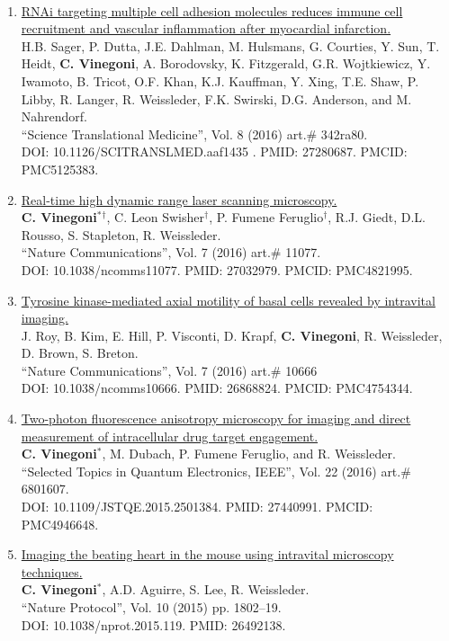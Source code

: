 \documentclass{resume}
\begin{document}
\begin{category}{~~}
\begin{enumerate}
\item
\href{https://tinyurl.com/y4hpumay}{RNAi targeting multiple cell adhesion molecules reduces immune cell recruitment and vascular inflammation after myocardial infarction.}\\
H.B. Sager, P. Dutta, J.E. Dahlman, M. Hulsmans, G. Courties, Y. Sun, T. Heidt, {\bf C. Vinegoni}, A. Borodovsky, K. Fitzgerald, G.R. Wojtkiewicz, Y. Iwamoto, B. Tricot, O.F. Khan, K.J. Kauffman, Y. Xing, T.E. Shaw, P. Libby, R. Langer, R. Weissleder, F.K. Swirski, D.G. Anderson, and M. Nahrendorf.\\
 ``Science Translational Medicine'', Vol. 8 (2016) art.$\#$ 342ra80. \\DOI:
10.1126/SCITRANSLMED.aaf1435 . PMID: 27280687. PMCID: PMC5125383.

\item
\href{https://tinyurl.com/jrvjrusj}{Real-time high dynamic range laser scanning microscopy.}\\
{\bf C. Vinegoni$^*${$^\dag$}}, C. Leon Swisher$^\dag$, P. Fumene Feruglio$^\dag$, R.J. Giedt, D.L. Rousso, S. Stapleton, R. Weissleder.\\
 ``Nature Communications'', Vol. 7 (2016) art.$\#$ 11077. \\DOI:
10.1038/ncomms11077. PMID: 27032979. PMCID: PMC4821995.

\item
\href{https://tinyurl.com/yx8ye7m3}{Tyrosine kinase-mediated axial motility of basal cells revealed by intravital imaging.}\\
J. Roy, B. Kim, E. Hill, P. Visconti, D. Krapf, {\bf C. Vinegoni}, R. Weissleder, D. Brown, S. Breton.\\
 ``Nature Communications'', Vol. 7 (2016) art.$\#$ 10666 \\DOI:
10.1038/ncomms10666. PMID: 26868824. PMCID: PMC4754344.

\item
\href{https://tinyurl.com/y7uz4zbp}{Two-photon fluorescence anisotropy microscopy for imaging and direct measurement of intracellular drug target engagement.}\\
{\bf C. Vinegoni$^*$}, M. Dubach, P. Fumene Feruglio, and R. Weissleder.\\
 ``Selected Topics in Quantum Electronics, IEEE'', Vol. 22 (2016) art.$\#$ 6801607. \\DOI:
10.1109/JSTQE.2015.2501384. PMID: 27440991. PMCID: PMC4946648.


\item
\href{https://tinyurl.com/3njutdnt}{Imaging the beating heart in the mouse using intravital microscopy techniques.}\\
{\bf C. Vinegoni$^*$}, A.D. Aguirre, S. Lee, R. Weissleder.\\
 ``Nature Protocol'', Vol. 10 (2015) pp. 1802--19. \\DOI: 10.1038/nprot.2015.119. PMID: 26492138. 


\end{enumerate}
\end{category}
\end{document}
